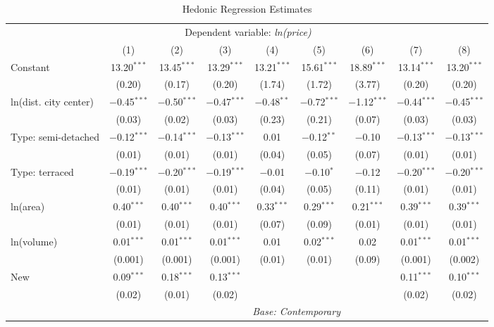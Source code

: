 \documentclass[]{article}
\begin{document}
\newpage

\begin{table}[!htbp] \centering 
  \caption{Hedonic Regression Estimates} 
  \label{tab:hedreg} 
\footnotesize 
\begin{tabular}{@{\extracolsep{5pt}}lcccccccc} 
\toprule
 & \multicolumn{6}{c}{Dependent variable: \emph{ln(price)}} \\ 
\cmidrule{2-9} 
 & (1) & (2) & (3) & (4) & (5) & (6) & (7) & (8)\\ 
\midrule
Constant & 13.20$^{***}$ & 13.45$^{***}$ & 13.29$^{***}$ & 13.21$^{***}$ & 15.61$^{***}$ & 18.89$^{***}$ & 13.14$^{***}$ & 13.20$^{***}$ \\ 
  & (0.20) & (0.17) & (0.20) & (1.74) & (1.72) & (3.77) & (0.20) & (0.20) \\ 
  ln(dist. city center) & $-$0.45$^{***}$ & $-$0.50$^{***}$ & $-$0.47$^{***}$ & $-$0.48$^{**}$ & $-$0.72$^{***}$ & $-$1.12$^{***}$ & $-$0.44$^{***}$ & $-$0.45$^{***}$ \\ 
  & (0.03) & (0.02) & (0.03) & (0.23) & (0.21) & (0.07) & (0.03) & (0.03) \\ 
  Type: semi-detached & $-$0.12$^{***}$ & $-$0.14$^{***}$ & $-$0.13$^{***}$ & 0.01 & $-$0.12$^{**}$ & $-$0.10 & $-$0.13$^{***}$ & $-$0.13$^{***}$ \\ 
  & (0.01) & (0.01) & (0.01) & (0.04) & (0.05) & (0.07) & (0.01) & (0.01) \\ 
  Type: terraced & $-$0.19$^{***}$ & $-$0.20$^{***}$ & $-$0.19$^{***}$ & $-$0.01 & $-$0.10$^{*}$ & $-$0.12 & $-$0.20$^{***}$ & $-$0.20$^{***}$ \\ 
  & (0.01) & (0.01) & (0.01) & (0.04) & (0.05) & (0.11) & (0.01) & (0.01) \\ 
  ln(area) & 0.40$^{***}$ & 0.40$^{***}$ & 0.40$^{***}$ & 0.33$^{***}$ & 0.29$^{***}$ & 0.21$^{***}$ & 0.39$^{***}$ & 0.39$^{***}$ \\ 
  & (0.01) & (0.01) & (0.01) & (0.07) & (0.09) & (0.01) & (0.01) & (0.01) \\ 
  ln(volume) & 0.01$^{***}$ & 0.01$^{***}$ & 0.01$^{***}$ & 0.01 & 0.02$^{***}$ & 0.02 & 0.01$^{***}$ & 0.01$^{***}$ \\ 
  & (0.001) & (0.001) & (0.001) & (0.01) & (0.01) & (0.09) & (0.001) & (0.002) \\ 
  New & 0.09$^{***}$ & 0.18$^{***}$ & 0.13$^{***}$ &  &  &  & 0.11$^{***}$ & 0.10$^{***}$ \\ 
  & (0.02) & (0.01) & (0.02) &  &  &  & (0.02) & (0.02) \\ 
  \cmidrule{2-9}
  & \multicolumn{8}{c}{\emph{Base: Contemporary}} \\

\end{tabular}
\end{table}
\end{document}
